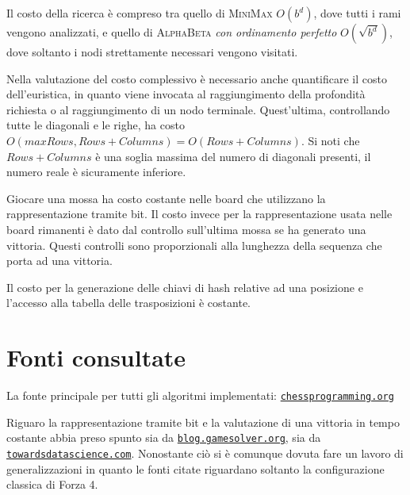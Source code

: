 \documentclass[a4paper]{article}
\begin{document}
Il costo della ricerca è compreso tra quello di \textsc{MiniMax} $O(b^d)$, 
dove tutti i rami vengono analizzati, e quello di \textsc{AlphaBeta} 
\emph{con ordinamento perfetto} $O(\sqrt{b^d})$, dove soltanto i nodi 
strettamente necessari vengono visitati.\medskip

Nella valutazione del costo complessivo è necessario anche quantificare 
il costo dell'euristica, in quanto viene invocata al raggiungimento della 
profondità richiesta o al raggiungimento di un nodo terminale. Quest'ultima, 
controllando tutte le diagonali e le righe, ha costo $O(max{Rows, Rows + 
Columns}) = O(Rows + Columns)$. Si noti che $Rows + Columns$ è una soglia massima
del numero di diagonali presenti, il numero reale è sicuramente inferiore.\medskip

Giocare una mossa ha costo costante nelle board che utilizzano la rappresentazione 
tramite bit. Il costo invece per la rappresentazione usata nelle board rimanenti
è dato dal controllo sull'ultima mossa se ha generato una vittoria. Questi 
controlli sono proporzionali alla lunghezza della sequenza che porta ad una 
vittoria.\medskip

Il costo per la generazione delle chiavi di hash relative ad una posizione e 
l'accesso alla tabella delle trasposizioni è costante.

\section{Fonti consultate}
La fonte principale per tutti gli algoritmi implementati: 
\href{chessprogramming.org}{\texttt{chessprogramming.org}}\medskip

Riguaro la rappresentazione tramite bit e la valutazione di una vittoria in 
tempo costante abbia preso spunto sia da \href{http://blog.gamesolver.org/solving-connect-four/06-bitboard/}{\texttt{blog.gamesolver.org}},
sia da \href{https://towardsdatascience.com/creating-the-perfect-connect-four-ai-bot-c165115557b0}{\texttt{towardsdatascience.com}}.
Nonostante ciò si è comunque dovuta fare un lavoro di generalizzazioni in quanto 
le fonti citate riguardano soltanto la configurazione classica di Forza 4.
\end{document}
